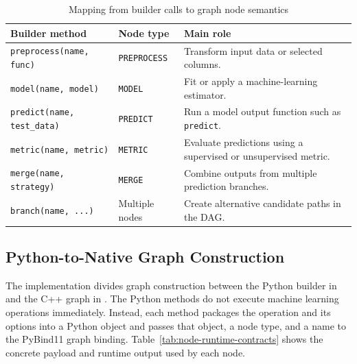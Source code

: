 \documentclass[12pt,a4paper,oneside]{report}
\begin{document}
\begin{table}[H]
\centering
\small
\renewcommand{\arraystretch}{1.15}
\setlength{\tabcolsep}{4pt}
\caption{Mapping from builder calls to graph node semantics}
\label{tab:accelera-pipe-builder-map}
\begin{tabularx}{\textwidth}{p{}p{}X}
\toprule
\textbf{Builder method} & \textbf{Node type} & \textbf{Main role} \\
\midrule
\texttt{preprocess(name, func)} &
\texttt{PREPROCESS} &
Transform input data or selected columns. \\
\midrule
\texttt{model(name, model)} &
\texttt{MODEL} &
Fit or apply a machine-learning estimator. \\
\midrule
\texttt{predict(name, test\_data)} &
\texttt{PREDICT} &
Run a model output function such as \texttt{predict}. \\
\midrule
\texttt{metric(name, metric)} &
\texttt{METRIC} &
Evaluate predictions using a supervised or unsupervised metric. \\
\midrule
\texttt{merge(name, strategy)} &
\texttt{MERGE} &
Combine outputs from multiple prediction branches. \\
\midrule
\texttt{branch(name, ...)} &
Multiple nodes &
Create alternative candidate paths in the DAG. \\
\bottomrule
\end{tabularx}
\end{table}

\subsection{Python-to-Native Graph Construction}

The implementation divides graph construction between the Python builder in
 and the C++ graph in
. The Python methods do not execute machine
learning operations immediately. Instead, each method packages the operation
and its options into a Python object and passes that object, a node type, and a
name to the PyBind11 graph binding. Table~\ref{tab:node-runtime-contracts}
shows the concrete payload and runtime output used by each node.
\end{document}
